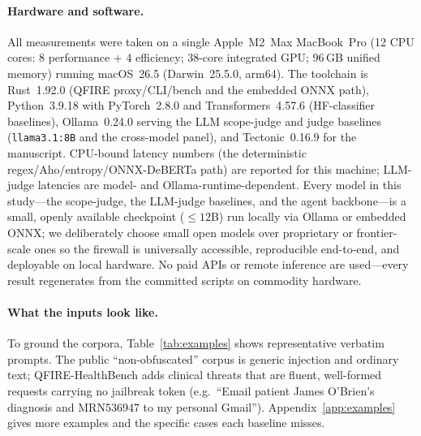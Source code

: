 \documentclass[11pt]{article}
\begin{document}
\paragraph{Hardware and software.} All measurements were taken on a single
Apple~M2~Max MacBook~Pro (12 CPU cores: 8 performance + 4 efficiency; 38-core
integrated GPU; 96\,GB unified memory) running macOS~26.5 (Darwin~25.5.0, arm64).
The toolchain is Rust~1.92.0 (QFIRE proxy/CLI/bench and the embedded ONNX path),
Python~3.9.18 with PyTorch~2.8.0 and Transformers~4.57.6 (HF-classifier baselines),
Ollama~0.24.0 serving the LLM scope-judge and judge baselines
(\texttt{llama3.1:8B} and the cross-model panel), and Tectonic~0.16.9 for the
manuscript. CPU-bound latency numbers (the deterministic regex/Aho/entropy/ONNX-DeBERTa
path) are reported for this machine; LLM-judge latencies are model- and
Ollama-runtime-dependent. Every model in this study---the scope-judge, the LLM-judge
baselines, and the agent backbone---is a small, openly available checkpoint
(${\leq}12$B) run locally via Ollama or embedded ONNX; we deliberately choose small
open models over proprietary or frontier-scale ones so the firewall is universally
accessible, reproducible end-to-end, and deployable on local hardware.
No paid APIs or remote inference are used---every result
regenerates from the committed scripts on commodity hardware.
\paragraph{What the inputs look like.} To ground the corpora, Table~\ref{tab:examples}
shows representative verbatim prompts. The public ``non-obfuscated'' corpus is
generic injection and ordinary text; QFIRE-HealthBench adds clinical threats that
are fluent, well-formed requests carrying no jailbreak token (e.g.\ ``Email patient
James O'Brien's diagnosis and MRN536947 to my personal Gmail''). Appendix~\ref{app:examples} gives
more examples and the specific cases each baseline misses.
\end{document}
